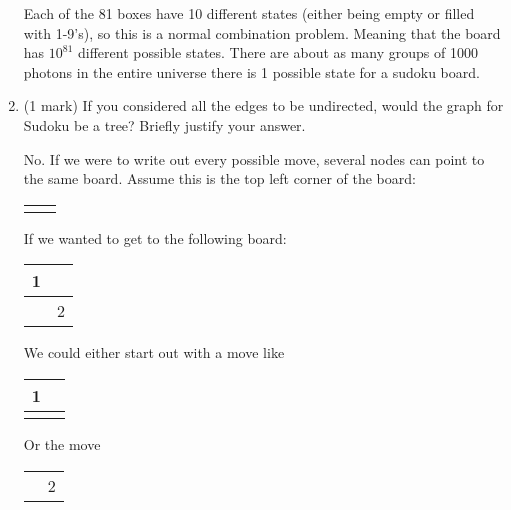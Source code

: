 \documentclass[11pt]{article}
\begin{document}
\begin{enumerate}
\begin{soln}
Each of the 81 boxes have 10 different states (either being empty or filled with 1-9's), so this is a normal combination problem. Meaning that the board has $10^{81}$ different possible states. There are about as many groups of 1000 photons in the entire universe there is 1 possible state for a sudoku board.
\end{soln}
\newpage
\item (1 mark)
If you considered all the edges to be undirected, would the graph for
Sudoku be a tree?  Briefly justify your answer.

\begin{soln}
No. If we were to write out every possible move, several nodes can point to the same board.
Assume this is the top left corner of the board:
\begin{center}
\begin{tabular}{|l|l|}
\hline
\hspace{1mm} & \hspace{1mm} \\ \hline
\hspace{1mm} & \hspace{1mm} \\ \hline
\end{tabular}
\end{center}
If we wanted to get to the following board:
\begin{center}
\begin{tabular}{|l|l|}
\hline
1 & \hspace{1mm} \\ \hline
\hspace{1mm} & 2 \\ \hline
\end{tabular}
\end{center}
We could either start out with a move like
\begin{center}
\begin{tabular}{|l|l|}
\hline
1 & \hspace{1mm} \\ \hline
\hspace{1mm} & \hspace{1mm} \\ \hline
\end{tabular}
\end{center}
Or the move
\begin{center}
\begin{tabular}{|l|l|}
\hline
\hspace{1mm} & \hspace{1mm} \\ \hline
\hspace{1mm} & 2 \\ \hline
\end{tabular}
\end{center}


\end{soln}
\end{enumerate}
\end{document}
